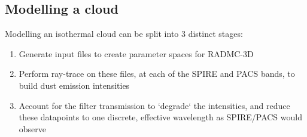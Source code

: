 \documentclass{report}
\begin{document}

\subsection{Modelling a cloud}
Modelling an isothermal cloud can be split into 3 distinct stages:

\begin{enumerate}
  \item Generate input files to create parameter spaces for RADMC-3D
  \item Perform ray-trace on these files, at each of the SPIRE and PACS bands, to build dust emission intensities
  \item Account for the filter transmission to `degrade` the intensities, and reduce these datapoints to one discrete, effective wavelength as SPIRE/PACS would observe
\end{enumerate}
\end{document}
